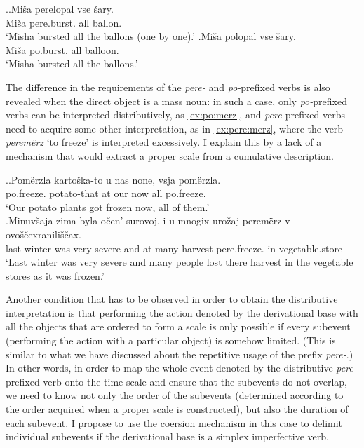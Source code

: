 \ex.\ag.\label{ex:balloon:pere}Mi\v{s}a perelopal vse \v{s}ary.\\
Mi\v{s}a pere.burst. all ballon.\\
\trans `Misha bursted all the ballons (one by one).'
\bg.\label{ex:balloon:po}Mi\v{s}a polopal vse \v{s}ary.\\
Mi\v{s}a po.burst. all balloon.\\
\trans `Misha bursted all the ballons.'

The difference in the requirements of the \textit{pere-} and \textit{po-}prefixed verbs is also revealed when the direct object is a mass noun: in such a case, only \textit{po-}prefixed verbs can be interpreted distributively, as \ref{ex:po:merz}, and \textit{pere-}prefixed verbs need to acquire some other interpretation, as in \ref{ex:pere:merz}, where the verb \textit{perem\"{e}rz} `to freeze' is interpreted excessively. I explain this by a lack of a mechanism that would extract a proper scale from a cumulative description.

\ex.\ag.\label{ex:po:merz}Pom\"{e}rzla karto\v{s}ka-to u nas none, vsja pom\"{e}rzla.\\
po.freeze. potato-that at our now all po.freeze.\\
\trans `Our potato plants got frozen now, all of them.'\\
\bg.\label{ex:pere:merz}Minuv\v{s}aja zima byla o\v{c}en' surovoj, i u mnogix uro\v{z}aj perem\"{e}rz v ovo\v{s}\v{c}exranili\v{s}\v{c}ax.\\
last winter was very severe and at many harvest pere.freeze. in vegetable.store\\
\trans `Last winter was very severe and many people lost there harvest in the vegetable stores as it was frozen.'

Another condition that has to be observed in order to obtain the distributive interpretation is that performing the action denoted by the derivational base with all the objects that are ordered to form a scale is only possible if every subevent (performing the action with a particular object) is somehow limited. (This is similar to what we have discussed about the repetitive usage of the prefix \textit{pere-}.) In other words, in order to map the whole event denoted by the distributive \textit{pere-}prefixed verb onto the time scale and ensure that the subevents do not overlap, we need to know not only the order of the subevents (determined according to the order acquired when a proper scale is constructed), but also the duration of each subevent. I propose to use the coersion mechanism in this case to delimit individual subevents if the derivational base is a simplex imperfective verb.

